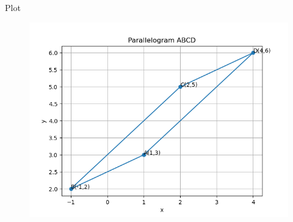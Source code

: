 \documentclass{beamer}
\begin{document}
\begin{frame}{Plot}
    \begin{figure}[h!]
    \centering
    \includegraphics[height=0.6\textheight, keepaspectratio]{figs/plotc.png}
    \label{figure_1}
\end{figure}
\end{frame}
\end{document}
